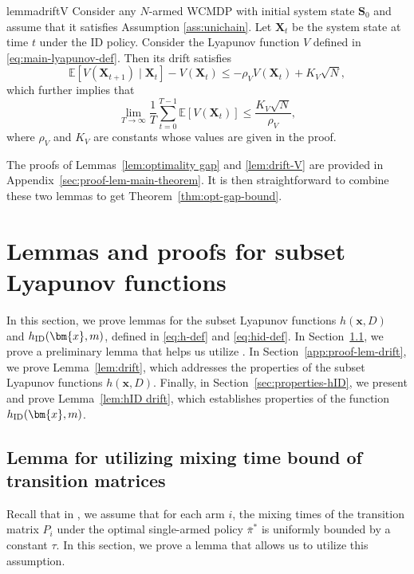 \documentclass{article}
\theoremstyle{plain}
\theoremstyle{remark}
\newcommand{\E}[1]{\mathbb{E}\left[#1\right]}
\newcommand{\givenplain}{\;|\;}
\newcommand{\mx}{\bm{x}}
\newcommand{\pibar}{{\sysbar{\pi}}}
\newcommand{\pibs}{{\pibar^*}}
\newcommand{\sysbar}[1]{\bar{#1}}
\newcommand{\rhov}{\rho_V}
\newcommand{\Kv}{K_V}
\newcommand{\ID}{\textnormal{ID}}
\def\mX{{\bm{X}}}
\newcommand{\EE}{\mathbb{E}}
\newcommand{\mbracket}[1]{\left[#1\right]}
\begin{document}
\begin{restatable}{lemma}{driftV}\label{lem:drift-V}
Consider any $N$-armed WCMDP with initial system state $\bm{S}_0$ and assume that it satisfies Assumption \ref{ass:unichain}.
Let $\mX_t$ be the system state at time $t$ under the ID policy.
Consider the Lyapunov function $V$ defined in \eqref{eq:main-lyapunov-def}.
Then its drift satisfies
\begin{equation}
    \label{eq:main-drift-inequality}
    \EE\mbracket{V(\mX_{t+1}) \givenplain \mX_t}-V(\mX_t) \leq -\rhov V(\mX_t) + \Kv \sqrt{N}, 
\end{equation}
which further implies that
\begin{equation}
    \label{eq:main-final-EV-bound}
    \lim_{T\to\infty} \frac{1}{T} \sum_{t=0}^{T-1} \E{V(\mX_{t})} \leq \frac{\Kv\sqrt{N}}{\rhov},
\end{equation}
where $\rhov$ and $\Kv$ are constants whose values are given in the proof. 
\end{restatable}

The proofs of Lemmas~\ref{lem:optimality gap} and \ref{lem:drift-V} are provided in Appendix~\ref{sec:proof-lem-main-theorem}.
It is then straightforward to combine these two lemmas to get Theorem~\ref{thm:opt-gap-bound}.




\section{Lemmas and proofs for subset Lyapunov functions}
\label{sec:lem-proof-subset}
In this section, we prove lemmas for the subset Lyapunov functions $h(\mx,D)$ and $h_{\ID}(\mx,m)$, defined in \eqref{eq:h-def} and \eqref{eq:hid-def}. 
In Section~\ref{sec:preliminary-transition}, we prove a preliminary lemma that helps us utilize . 
In Section~\ref{app:proof-lem-drift}, we prove Lemma~\ref{lem:drift}, which addresses the properties of the subset Lyapunov functions $h(\mx,D)$.
Finally, in Section~\ref{sec:properties-hID}, we present and prove Lemma~\ref{lem:hID drift}, which establishes properties of the function $h_{\ID}(\mx,m)$. 



\subsection{Lemma for utilizing mixing time bound of transition matrices}
\label{sec:preliminary-transition}
Recall that in , we assume that for each arm $i$, the mixing times of the transition matrix $P_i$ under the optimal single-armed policy $\pibs$ is uniformly bounded by a constant $\tau$. 
In this section, we prove a lemma that allows us to utilize this assumption. 
\end{document}
